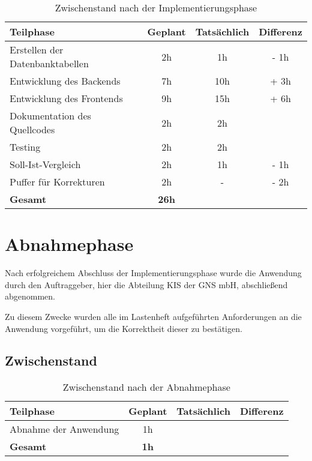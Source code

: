 \documentclass[12pt, xcolor=dvipsnames]{scrartcl}
\begin{document}
\begin{table}[H]
	\centering
	\begin{tabular}{lccc}

		\rowcolor{white!15}				
		\textbf{Teilphase} & \textbf{Geplant} & \textbf{Tatsächlich} & \textbf{Differenz} \\\hline		
		

		Erstellen der Datenbanktabellen & 2h & 1h 	& - 1h\\	    
	    Entwicklung des Backends 		& 7h & 10h 	& + 3h\\	    
	    Entwicklung des Frontends 		& 9h & 15h 	& + 6h\\	     
	    Dokumentation des Quellcodes 	& 2h & 2h 	&  \\	      
   	    Testing 						& 2h & 2h 	& \\
   	    Soll-Ist-Vergleich 				& 2h & 1h 	& - 1h \\
   	    Puffer für Korrekturen 			& 2h & - 	& - 2h\\\hline   	    	    	    

		\rowcolor{white!15}				
		\textbf{Gesamt} & \textbf{26h} & \textbf{\timeImplementierung} & \textbf{\timeImplementierungDiff} \\			

	    
	\end{tabular}
	\caption{Zwischenstand nach der Implementierungsphase}
	\label{tab:zwischenstand_implementierungsphase}
	\end{table}

\section{Abnahmephase}
Nach erfolgreichem Abschluss der Implementierungsphase wurde die Anwendung durch den Auftraggeber, hier die Abteilung KIS der GNS mbH, abschließend abgenommen.

Zu diesem Zwecke wurden alle im Lastenheft aufgeführten Anforderungen an die Anwendung vorgeführt, um die Korrektheit dieser zu bestätigen.

\subsection{Zwischenstand}

\begin{table}[H]
	\centering
	\begin{tabular}{lccc}

		\rowcolor{white!15}				
		\textbf{Teilphase} & \textbf{Geplant} & \textbf{Tatsächlich} & \textbf{Differenz} \\\hline		
		
		\rowcolor{gray!15}
		Abnahme der Anwendung & 1h & \timeAbnahme & \timeAbnahmeDiff \\\hline

		\rowcolor{white!15}				
		\textbf{Gesamt} & \textbf{1h} & \textbf{\timeAbnahme} & \textbf{\timeAbnahmeDiff} \\			

	    
	\end{tabular}
	\caption{Zwischenstand nach der Abnahmephase}
	\label{tab:zwischenstand_abnahmephase}
\end{table}
\end{document}
